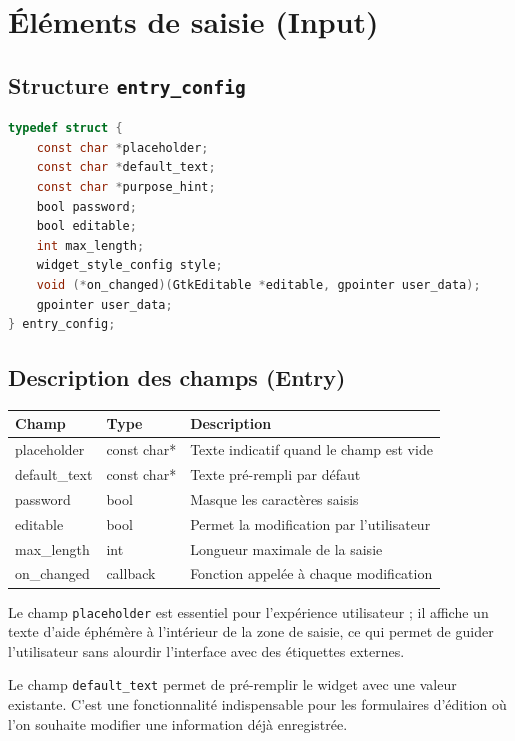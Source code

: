 \section{Éléments de saisie (Input)}

\subsection{Structure \texttt{entry\_config}}
\begin{lstlisting}[language=C]
typedef struct {
    const char *placeholder;
    const char *default_text;
    const char *purpose_hint;
    bool password;
    bool editable;
    int max_length;
    widget_style_config style;
    void (*on_changed)(GtkEditable *editable, gpointer user_data);
    gpointer user_data;
} entry_config;
\end{lstlisting}

\subsection{Description des champs (Entry)}
\begin{center}
\begin{tabular}{|l|l|p{5cm}|}
\hline
\textbf{Champ} & \textbf{Type} & \textbf{Description} \\
\hline
placeholder & const char* & Texte indicatif quand le champ est vide \\
\hline
default\_text & const char* & Texte pré-rempli par défaut \\
\hline
password & bool & Masque les caractères saisis \\
\hline
editable & bool & Permet la modification par l'utilisateur \\
\hline
max\_length & int & Longueur maximale de la saisie \\
\hline
on\_changed & callback & Fonction appelée à chaque modification \\
\hline
\end{tabular}
\end{center}

\bigskip

Le champ \texttt{placeholder} est essentiel pour l'expérience utilisateur ; il affiche un texte d'aide éphémère à l'intérieur de la zone de saisie, ce qui permet de guider l'utilisateur sans alourdir l'interface avec des étiquettes externes.

Le champ \texttt{default\_text} permet de pré-remplir le widget avec une valeur existante. C'est une fonctionnalité indispensable pour les formulaires d'édition où l'on souhaite modifier une information déjà enregistrée.

